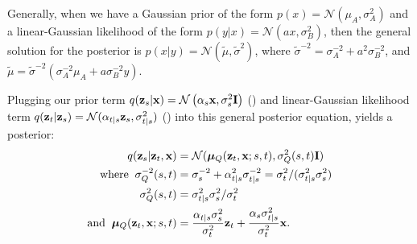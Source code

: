\documentclass{article}
\begin{document}
Generally, when we have a Gaussian prior of the form $p(x) = \mathcal{N}(\mu_A, \sigma_A^2)$ and a linear-Gaussian likelihood of the form $p(y|x) = \mathcal{N}(a x, \sigma_B^2)$, then the general solution for the posterior is $p(x|y) = \mathcal{N}(\tilde{\mu}, \tilde{\sigma}^2)$, where $\tilde{\sigma}^{-2} = \sigma_A^{-2} + a^2 \sigma_B^{-2}$, and $\tilde{\mu} = \tilde{\sigma}^{-2} (\sigma_A^{-2} \mu_A + a \sigma_B^{-2} y)$.

Plugging our prior term $q({\mathbf{z}}_s|{\mathbf{x}}) = \mathcal{N}\left(\alpha_s {\mathbf{x}}, \sigma^2_s \mathbf{I}\right)$ () and linear-Gaussian likelihood term $q({\mathbf{z}}_t|{\mathbf{z}}_s) = \mathcal{N}(\alpha_{t|s} {\mathbf{z}}_s, \sigma^2_{t|s})$ () into this general posterior equation, yields a posterior:
\begin{align}
q(\rvz_s|\rvz_t,\rvx) &= \mathcal{N}(\bmu_{Q}(\rvz_{t},\rvx; s,t), \sigma^2_Q(s,t) \bfI)\\
\text{where\;\;}
\sigma^{-2}_Q(s,t) 
&= \sigma_s^{-2} + \alpha_{t|s}^{2}\sigma^{-2}_{t|s}\label{eq:postvar}
= \sigma^2_t / (\sigma^2_{t|s}\sigma^2_s)\\
\sigma^{2}_Q(s,t) &= \sigma^2_{t|s}\sigma^2_s / \sigma^2_t\\
\text{and\;\;}
\bmu_{Q}(\rvz_{t},\rvx; s,t) 
&
%
= \frac{\alpha_{t|s}\sigma^{2}_s}{\sigma^{2}_t}\rvz_{t} + \frac{\alpha_s \sigma^{2}_{t|s}}{\sigma^{2}_{t}}\rvx.
\end{align}
%
\end{document}

